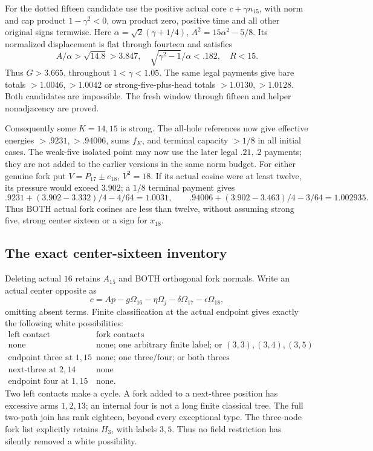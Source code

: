 \documentclass[11pt]{article}
\theoremstyle{definition}
\theoremstyle{remark}
\begin{document}
For the dotted fifteen candidate use the positive actual core
\(c+\gamma n_{15}\), with norm and cap product \(1-\gamma^2<0\),
own product zero, positive time and all other original signs termwise.
Here \(\alpha=\sqrt2(\gamma+1/4)\), \(A^2=15\alpha^2-5/8\).
Its normalized displacement is flat through fourteen and satisfies
\[
 A/\alpha>\sqrt{14.8}>3.847,\quad
 \sqrt{\gamma^2-1}/\alpha<.182,\quad R<15 .
\]
Thus \(G>3.665\), throughout \(1<\gamma<1.05\).
The same legal payments give bare totals \(>1.0046,>1.0042\)
or strong-five-plus-head totals \(>1.0130,>1.0128\).
Both candidates are impossible.
The fresh window through fifteen and helper nonadjacency are proved.

Consequently some \(K=14,15\) is strong.
The all-hole references now give effective energies
\(>.9231,>.94006\), sums \(f_K\), and terminal capacity \(>1/8\)
in all initial cases. The weak-five isolated point may now use
the later legal \(.21,.2\) payments; they are not added to the
earlier versions in the same norm budget.
For either genuine fork put \(V=P_{17}\pm e_{18}\), \(V^2=18\).
If its actual cosine were at least twelve, its pressure would exceed
\(3.902\); a \(1/8\) terminal payment gives
\[
 .9231+(3.902-3.332)/4-4/64=1.0031,\qquad
 .94006+(3.902-3.463)/4-3/64=1.002935.
\]
Thus BOTH actual fork cosines are less than twelve, without assuming
strong five, strong center sixteen or a sign for \(x_{18}\).

\subsection{The exact center-sixteen inventory}
\label{app:D18centerinventory}
Deleting actual \(16\) retains \(A_{15}\) and BOTH orthogonal
fork normals. Write an actual center opposite as
\[
 c=Ap-g\Omega_{16}-\eta\Omega_j-\delta\Omega_{17}
      -\epsilon\Omega_{18},
\]
omitting absent terms. Finite classification at the actual endpoint gives
exactly the following white possibilities:
\[
\begin{array}{c|c}
 \text{left contact}&\text{fork contacts}\\ \hline
 \text{none}&\text{none; one arbitrary finite label; or }(3,3),(3,4),(3,5)\\
 \text{endpoint three at }1,15&
 \text{none; one three/four; or both threes}\\
 \text{next-three at }2,14&\text{none}\\
 \text{endpoint four at }1,15&\text{none}.
\end{array}
\]
Two left contacts make a cycle. A fork added to a next-three
position has excessive arms \(1,2,13\); an internal four is not a
long finite classical tree. The full two-path join has rank eighteen,
beyond every exceptional type. The three-node fork list explicitly
retains \(H_3\), with labels \(3,5\). Thus no field restriction has
silently removed a white possibility.
\end{document}
